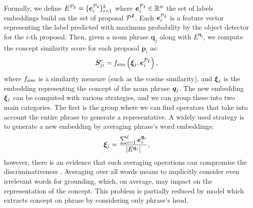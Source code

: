 Formally, we define $E^{\mathcal{P}_{\bm{I}}} = \{ \bm{e}^{\mathcal{P}_{\bm{I}}}_i \}^{k}_{i=1}$ where $\bm{e}^{\mathcal{P}_{\bm{I}}}_i \in
\mathbb{R}^w$ the set of labels embeddings build on the set of proposal
$\mathcal{P}^{\bm{I}}$. Each $\bm{e}^{\mathcal{P}_{\bm{I}}}_i$ is a feature vector representing the
label predicted with maximum probability by the object detector for
the $i$-th proposal. Then, given a noun phrase $\bm{q}_j$ along with
$E^{\bm{q}_j}$, we compute the concept similarity score for each
proposal $\bm{p}_i$ as:
\begin{equation}
  \bm{S}^c_{ji} = f_{\text{sim}} \left( \bm{\xi}_j, \bm{e}^{\mathcal{P}_{\bm{I}}}_i \right),
\end{equation}
where $f_{\text{sim}}$ is a similarity measure (such as the cosine similarity),
and $\bm{\xi}_j$ is the embedding representing the concept of the noun
phrase $\bm{q}_j$. The new embedding $\bm{\xi}_j$ can be computed with various
strategies, and we can group these into two main categories. The first
is the group where we can find operators that take into account the
entire phrase to generate a representative. A widely used strategy is
to generate a new embedding by averaging phrase's word embeddings:
\begin{equation}
  \bm{\xi}_j = \frac{\sum^l_{i=1} \bm{e}^{\bm{q}_j}_i}{| E^{\bm{q}_j} |},
\end{equation}
however, there is an evidence that such averaging operations can
compromise the discriminativeness
\cite{wang2019phrase,datta2019align2ground}. Averaging over all words
means to implicitly consider even irrelevant words for grounding,
which, on average, may impact on the representation of the concept.
This problem is partially reduced by model which extracts concept on
phrase by considering only phrase's head.

